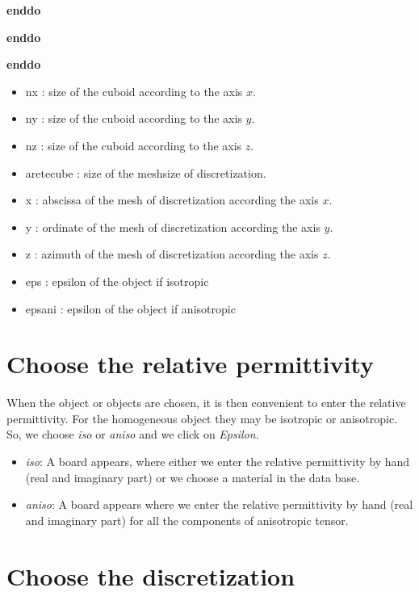     \hspace{15mm} {\bf enddo}

  \hspace{10mm} {\bf enddo}

 \hspace{5mm} {\bf enddo}


\vspace{10mm}

\begin{itemize}
\item nx : size of the cuboid according to the axis $x$.
\item ny : size of the cuboid according to the axis $y$.
\item nz : size of the cuboid according to the axis $z$.
\item aretecube : size of the meshsize of discretization. 
\item x : abscissa of the mesh of discretization according the axis
  $x$.
\item y : ordinate of the mesh of discretization according the axis
  $y$.
\item z : azimuth of the mesh of discretization according the axis
  $z$.
\item eps : epsilon of the object if isotropic
\item epsani : epsilon of the object if anisotropic
\end{itemize}

\section{Choose the relative permittivity}

When the object or objects are chosen, it is then convenient to enter
the relative permittivity. For the homogeneous object they may be
isotropic or anisotropic. So, we choose {\it iso} or {\it aniso} and
we click on {\it Epsilon}.

\begin{itemize} 
\item {\it iso}: A board appears, where either we enter the relative
  permittivity by hand (real and imaginary part) or we choose a
  material in the data base.
\item {\it aniso}: A board appears where we enter the relative
  permittivity by hand (real and imaginary part) for all the
  components of anisotropic tensor.
\end{itemize}

\section{Choose the discretization}

